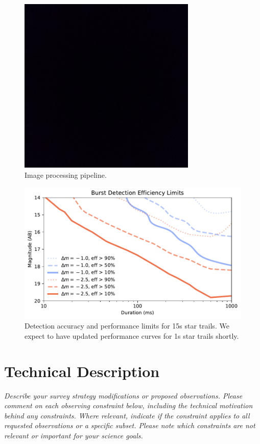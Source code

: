 \documentclass[12pt, letterpaper]{article}
\begin{document}
\begin{figure}[htb!]
\center
\includegraphics{bbox.jpeg}
\caption{Image processing pipeline.}
\label{fig:pipeline}
\end{figure}

\begin{figure}[htb!]
\center
\includegraphics{f7.pdf}
\caption{Detection accuracy and performance limits for 15s star trails. {\color{green} We expect to have updated performance curves for 1s star trails shortly.}}
\label{fig:limit}
\end{figure}

\vspace{.6in}
\newpage
\section{Technical Description}
\label{sec:technical}
\begin{footnotesize}
{\it Describe your survey strategy modifications or proposed observations. Please comment on each observing constraint
below, including the technical motivation behind any constraints. Where relevant, indicate
if the constraint applies to all requested observations or a specific subset. Please note which 
constraints are not relevant or important for your science goals.}
\end{footnotesize}
\end{document}
